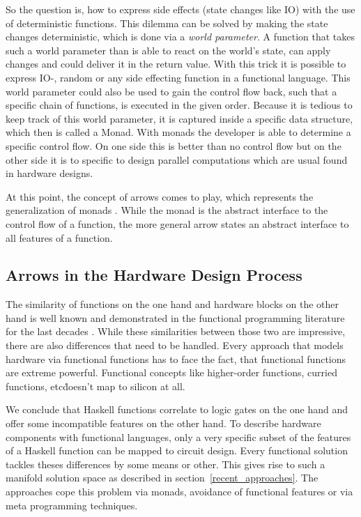 \documentclass{article}
\begin{document}
\par
So the question is, how to express side effects (state changes like IO) with the use of deterministic functions. This dilemma can be solved
by making the state changes deterministic, which is done via a \emph{world parameter}. A function that takes such a world parameter than
is able to react on the world's state, can apply changes and could deliver it in the return value. With this trick it is possible to express
IO-, random or any side effecting function in a functional language. This world parameter could also be used to gain the control flow back,
such that a specific chain of functions, is executed in the given order. Because it is tedious to keep track of this world parameter, it is
captured inside a specific data structure, which then is called a Monad. With monads the developer is able to determine a specific control
flow. On one side this is better than no control flow but on the other side it is to specific to design parallel computations which are
usual found in hardware designs. 

\par
At this point, the concept of arrows comes to play, which represents the generalization of monads \cite{Hughes98generalisingmonads}. While
the monad is the abstract interface to the control flow of a function, the more general arrow states an abstract interface to all features
of a function.


\subsection{Arrows in the Hardware Design Process}
The similarity of functions on the one hand and hardware blocks on the other hand is well known and demonstrated in the functional
programming literature for the last decades \cite{Sheeran:PerfectMatch,Donnell}. While these similarities between those two are impressive,
there are also differences that need to be handled. Every approach that models hardware via functional functions has to face the fact, that
functional functions are extreme powerful. Functional concepts like higher-order functions, curried functions, etc\. doesn't map to silicon at
all. 

\par
We conclude that Haskell functions correlate to logic gates on the one hand and offer some incompatible features on the other hand. To
describe hardware components with functional languages, only a very specific subset of the features of a Haskell function can be mapped to
circuit design. Every functional solution tackles theses differences by some means or other. This gives rise to such a manifold solution
space as described in section~\ref{recent_approaches}. The approaches cope this problem via monads, avoidance of functional features or via
meta programming techniques. 
\end{document}
